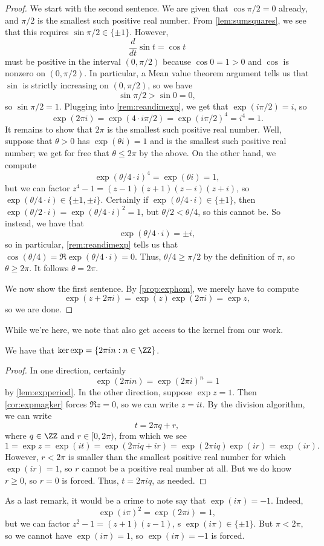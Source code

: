 \begin{proof}
	We start with the second sentence. We are given that $\cos\pi/2=0$ already, and $ \pi/2$ is the smallest such positive real number. From \autoref{lem:sumsquares}, we see that this requires $\sin \pi/2\in\{\pm1\}$. However,
	\[\frac d{dt}\sin t=\cos t\]
	must be positive in the interval $(0, \pi/2)$ because $\cos0=1>0$ and $\cos$ is nonzero on $(0, \pi/2)$. In particular, a Mean value theorem argument tells us that $\sin$ is strictly increasing on $(0, \pi/2)$, so we have
	\[\sin \pi/2>\sin0=0,\]
	so $\sin \pi/2=1$. Plugging into \autoref{rem:reandimexp}, we get that $\exp(i\pi/2)=i$, so
	\[\exp(2\pi i)=\exp(4\cdot i\pi/2)=\exp(i\pi/2)^4=i^4=1.\]
	It remains to show that $2\pi$ is the smallest such positive real number. Well, suppose that $\theta>0$ has $\exp(\theta i)=1$ and is the smallest such positive real number; we get for free that $\theta\le2\pi$ by the above. On the other hand, we compute
	\[\exp(\theta/4\cdot i)^4=\exp(\theta i)=1,\]
	but we can factor $z^4-1=(z-1)(z+1)(z-i)(z+i)$, so $\exp(\theta/4\cdot i)\in\{\pm1,\pm i\}$. Certainly if $\exp(\theta/4\cdot i)\in\{\pm1\}$, then $\exp(\theta/2\cdot i)=\exp(\theta/4\cdot i)^2=1$, but $\theta/2<\theta/4$, so this cannot be. So instead, we have that
	\[\exp(\theta/4\cdot i)=\pm i,\]
	so in particular, \autoref{rem:reandimexp} tells us that $\cos(\theta/4)=\Re\exp(\theta/4\cdot i)=0$. Thus, $\theta/4\ge\pi/2$ by the definition of $\pi$, so $\theta\ge2\pi$. It follows $\theta=2\pi$.

	We now show the first sentence. By \autoref{prop:exphom}, we merely have to compute
	\[\exp(z+2\pi i)=\exp(z)\exp(2\pi i)=\exp z,\]
	so we are done.
\end{proof}
While we're here, we note that also get access to the kernel from our work.
\begin{prop} \label{prop:expker}
	We have that $\ker\exp=\{2\pi in:n\in\ZZ\}$.
\end{prop}
\begin{proof}
	In one direction, certainly
	\[\exp(2\pi in)=\exp(2\pi i)^n=1\]
	by \autoref{lem:expperiod}. In the other direction, suppose $\exp z=1$. Then \autoref{cor:expmagker} forces $\Re z=0$, so we can write $z=it$. By the division algorithm, we can write
	\[t=2\pi q+r,\]
	where $q\in\ZZ$ and $r\in[0,2\pi)$, from which we see
	\[1=\exp z=\exp(it)=\exp(2\pi i q+ir)=\exp(2\pi iq)\exp(ir)=\exp(ir).\]
	However, $r<2\pi$ is smaller than the smallest positive real number for which $\exp(ir)=1$, so $r$ cannot be a positive real number at all. But we do know $r\ge0$, so $r=0$ is forced. Thus, $t=2\pi iq$, as needed.
\end{proof}
\begin{remark}[Nir] \label{rem:eipi}
	As a last remark, it would be a crime to note say that $\exp(i\pi)=-1$. Indeed,
	\[\exp(i\pi)^2=\exp(2\pi i)=1,\]
	but we can factor $z^2-1=(z+1)(z-1)$, s $\exp(i\pi)\in\{\pm1\}$. But $\pi<2\pi$, so we cannot have $\exp(i\pi)=1$, so $\exp(i\pi)=-1$ is forced.
\end{remark}

